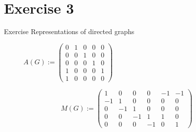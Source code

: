 
\section{Exercise 3}

\setcounter{exercise}{1}

\begin{frame}[allowframebreaks]{Exercise \thesection}{Representations of directed graphs}
    \begin{exercisenoinc}
        \begin{figure}[H]
    \centering
    $A(G) :=
    \begin{pmatrix}
      0 & 1 & 0 & 0 & 0 \\ %
      0 & 0 & 1 & 0 & 0 \\ %
      0 & 0 & 0 & 1 & 0 \\ %
      1 & 0 & 0 & 0 & 1 \\ %
      1 & 0 & 0 & 0 & 0 %
    \end{pmatrix}$
\end{figure}
    \end{exercisenoinc}
    \begin{solution}
    \end{solution}
    \begin{solution}
        \[ M(G) := 
        \begin{pmatrix}
1 & 0 & 0 & 0 & -1 & -1 \\
-1 & 1 & 0 & 0 & 0 & 0 \\
0 & -1 & 1 & 0 & 0 & 0 \\
0 & 0 & -1 & 1 & 1 & 0 \\
0 & 0 & 0 & -1 & 0 & 1
        \end{pmatrix}
        \]
    \end{solution}
    \begin{solution}
    \end{solution}
\end{frame}